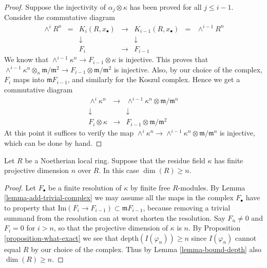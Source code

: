 \begin{proof}
\medskip\noindent
Suppose the injectivity of $\alpha_j \otimes \kappa$ has been
proved for all $j \leq i - 1$. Consider the commutative diagram
$$
\begin{matrix}
\wedge^i R^n & = & K_i(R, x_{\bullet}) & \to & K_{i-1}(R, x_{\bullet})
& = & \wedge^{i-1} R^n \\
& & \downarrow & & \downarrow & & \\
& & F_i & \to & F_{i-1} & &
\end{matrix}
$$
We know that $\wedge^{i-1} \kappa^n \to F_{i-1} \otimes \kappa$
is injective. This proves that
$\wedge^{i-1} \kappa^n \otimes_{\kappa} \mathfrak m/\mathfrak m^2
\to F_{i-1} \otimes \mathfrak m/\mathfrak m^2$ is injective.
Also, by our choice of the complex, $F_i$ maps into
$\mathfrak mF_{i-1}$, and similarly for the Koszul complex.
Hence we get a commutative diagram
$$
\begin{matrix}
\wedge^i \kappa^n & \to &
\wedge^{i-1} \kappa^n \otimes \mathfrak m/\mathfrak m^n \\
\downarrow & & \downarrow \\
F_i \otimes \kappa & \to & F_{i-1}\otimes \mathfrak m/\mathfrak m^2
\end{matrix}
$$
At this point it suffices to verify the map
$\wedge^i \kappa^n \to
\wedge^{i-1} \kappa^n \otimes \mathfrak m/\mathfrak m^n$
is injective, which can be done by hand.
\end{proof}

\begin{lemma}
\label{lemma-dim-gl-dim}
Let $R$ be a Noetherian local ring.
Suppose that the residue field $\kappa$ has finite
projective dimension $n$ over $R$.
In this case $\dim(R) \geq n$.
\end{lemma}

\begin{proof}
Let $F_{\bullet}$ be a finite resolution of $\kappa$ by finite free
$R$-modules. By Lemma \ref{lemma-add-trivial-complex}
we may assume all the maps in the complex $F_{\bullet}$
have to property that $\text{Im}(F_i \to F_{i-1})
\subset \mathfrak m F_{i-1}$, because removing a trivial
summand from the resolution can at worst shorten the resolution.
Say $F_n \not = 0$ and $F_i = 0$ for $i > n$, so that
the projective dimension of $\kappa$ is $n$.
By Proposition \ref{proposition-what-exact} we see that
$\text{depth}(I(\varphi_n)) \geq n$ since $I(\varphi_n)$
cannot equal $R$ by our choice of the complex.
Thus by Lemma \ref{lemma-bound-depth} also $\dim(R) \geq n$.
\end{proof}

